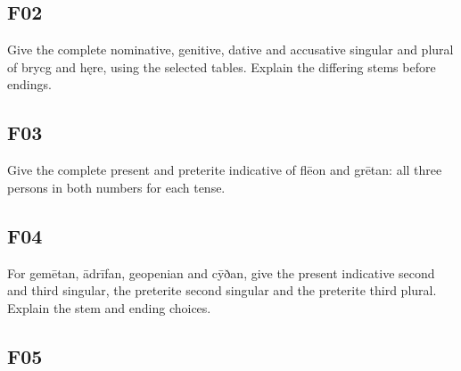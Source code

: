 \subsection*{F02}

\par\begin{minipage}{\linewidth}\raggedright
Give the complete nominative, genitive, dative and accusative singular and plural of brycg and hęre, using the selected tables. Explain the differing stems before endings.

\end{minipage}\par\addvspace{4pt}

\subsection*{F03}

\par\begin{minipage}{\linewidth}\raggedright
Give the complete present and preterite indicative of flēon and grētan: all three persons in both numbers for each tense.

\end{minipage}\par\addvspace{4pt}

\subsection*{F04}

\par\begin{minipage}{\linewidth}\raggedright
For gemētan, ādrīfan, geopenian and cȳðan, give the present indicative second and third singular, the preterite second singular and the preterite third plural. Explain the stem and ending choices.

\end{minipage}\par\addvspace{4pt}

\subsection*{F05}

